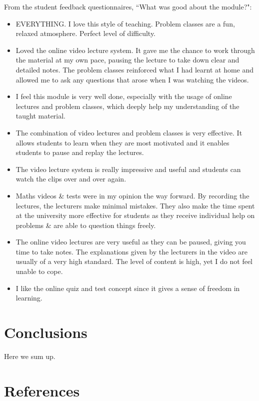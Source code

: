 \documentclass{amsart}
\begin{document}
From the student feedback questionnaires, ``What was good about the module?":
\begin{itemize}
\item EVERYTHING. I love this style of teaching. Problem classes are a fun, relaxed atmosphere. Perfect level of difficulty.
\item Loved the online video lecture system. It gave me the chance to work through the material at my own pace,
pausing the lecture to take down clear and detailed notes. The problem classes reinforced what I had learnt at
home and allowed me to ask any questions that arose when I was watching the videos.
\item I feel this module is very well done, especially with the usage of online lectures and problem classes, which deeply help my understanding of the taught material.
\item The combination of video lectures and problem classes is very effective. It allows students to learn when they
are most motivated and it enables students to pause and replay the lectures.
\item The video lecture system is really impressive and useful and students can watch the clips over and over again.
\item Maths videos \& tests were in my opinion the way forward. By recording the lectures, the lecturers make minimal
mistakes. They also make the time spent at the university more effective for students as they receive individual
help on problems \& are able to question things freely.
\item The online video lectures are very useful as they can be paused, giving you time to take notes. The explanations
given by the lecturers in the video are usually of a very high standard. The level of content is high, yet I do not
feel unable to cope.
\item I like the online quiz and test concept since it gives a sense of freedom in learning.
\end{itemize}

\section{Conclusions}
Here we sum up.

\section{References}
\end{document}
